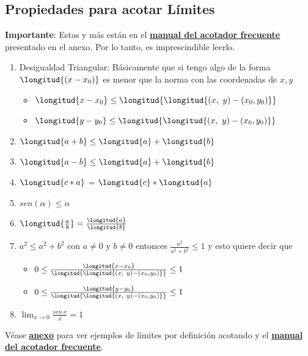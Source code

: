 \documentclass[10pt,a4paper]{article}
\begin{document}
\subsection*{Propiedades para acotar Límites}
\textbf{Importante}: Estas y más están en el \hyperref[subsec:acotador_frecuente]{\underline{\textbf{manual del acotador frecuente}}} presentado en el anexo. Por lo tanto, es imprescindible leerlo.
\begin{enumerate}
    \item \label{item:triangular} Desigualdad Triangular: Básicamente que si tengo algo de la forma $\longitud{(x-x_{0})}$ es menor que la norma con las coordenadas de $x, y$ 
    \begin{itemize}
        \item $ \longitud{x - x_{0}} \le \longitud{\longitud{(x,\ y) - (x_{0}, y_{0})}} $
        \item $ \longitud{y - y_{0}} \le \longitud{\longitud{(x,\ y) - (x_{0}, y_{0})}} $
    \end{itemize}
    \item \label{item:suma_norma} $\longitud{a+b} \le \longitud{a} + \longitud{b} $
    \item  $\longitud{a-b} \le \longitud{a} + \longitud{b} $
    \item \label{item:multiplicacion_norma}$\longitud{c*a}$ = $\longitud{c} * \longitud{a}$
    \item $sen(\alpha) \le \alpha$
    \item $\longitud{\frac{a}{b}} = \frac{\longitud{a}}{\longitud{b}}$
    \item \label{item:cuadratica_menor_que_norma} $a^{2} \le a^{2} + b^{2}$ con $a \neq 0$ y $b \neq 0$ entonces $\frac{a^{2}}{a^{2} + b^{2}} \le 1$ y esto quiere decir que
    \begin{itemize}
        \item $ 0 \le \frac{\longitud{x - x_{0}}}{\longitud{\longitud{(x,\ y) - (x_{0}, y_{0})}}} \le 1$
        \item $ 0 \le \frac{\longitud{y - y_{0}}}{\longitud{\longitud{(x,\ y) - (x_{0}, y_{0})}}} \le 1$
    \end{itemize}
    \item $\lim_{x \to 0} \frac{sen \ x}{x} = 1$
\end{enumerate}
Véase \hyperref[subsec:limites_definicion]{\underline{\textbf{anexo}}} para ver ejemplos de límites por definición acotando y el \hyperref[subsec:acotador_frecuente]{\underline{\textbf{manual del acotador frecuente}}}.
\end{document}
